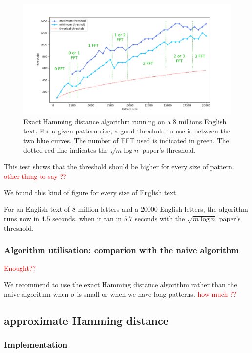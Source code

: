 \documentclass[preprint,12pt]{elsarticle}
\begin{document}
\begin{figure}[h]
\includegraphics[scale=0.56]{./figures/ExHDThresholdAll.png}
\caption{Exact Hamming distance algorithm
running on a $8$ millions English text.
For a given pattern size,
a good threshold to use is between the two blue curves.
The number of FFT used is indicated in green.
The dotted red line indicates the $\sqrt{m \log n}$ paper's threshold.}
\label{ExHDThreshAll}
\end{figure}


This test shows that the threshold should be higher for every size of pattern.
\textcolor{red}{other thing to say ??}

We found this kind of figure for every size of English text.

For an English text of $8$ million letters and a $20 000$ English letters,
the algorithm runs now in $4.5$ seconds, 
when it ran in $5.7$ seconds with the $\sqrt{m \log n}$ paper's threshold.

\subsubsection*{Algorithm utilisation: comparion with the naive algorithm}

\textcolor{red}{Enought??}

We recommend to use the exact Hamming distance algorithm rather than the naive algorithm
when $\sigma$ is small or when we have long patterns. \textcolor{red}{how much ??}


\subsection{approximate Hamming distance}

\subsubsection*{Implementation}
\end{document}

